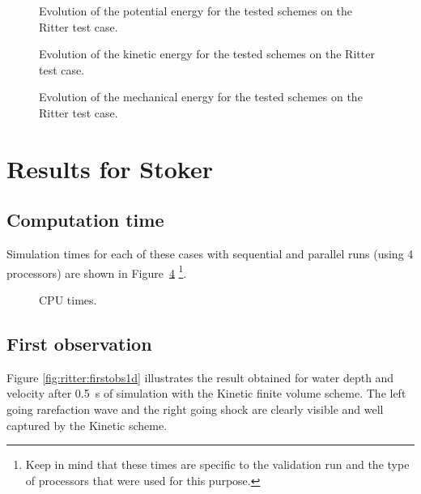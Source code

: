 \begin{figure}[H]
\centering
  \caption{Evolution of the potential energy for the tested schemes on the Ritter test case.}
\label{fig:ritter:Ep}
\end{figure}

\begin{figure}[H]
\centering
  \caption{Evolution of the kinetic energy for the tested schemes on the Ritter test case.}
\label{fig:ritter:Ec}
\end{figure}

\begin{figure}[H]
\centering
  \caption{Evolution of the mechanical energy for the tested schemes on the Ritter test case.}
\label{fig:ritter:Em}
\end{figure}

\newpage

\section{Results for Stoker}

\subsection{Computation time}

Simulation times for each of these cases with sequential and parallel runs
(using 4 processors) are shown in Figure~\ref{fig:stoker:cputime}
\footnote{Keep in mind that these times
are specific to the validation run and the type of processors that were used for this purpose.}.

\begin{figure}[h!]
  \centering
  \caption{CPU times.}\label{fig:stoker:cputime}
\end{figure}

\subsection{First observation}

Figure \ref{fig:ritter:firstobs1d} illustrates the result obtained for water
depth and velocity after 0.5~s of simulation with the Kinetic finite volume scheme.
The left going rarefaction wave and the right going shock are
clearly visible and well captured by the Kinetic scheme.

